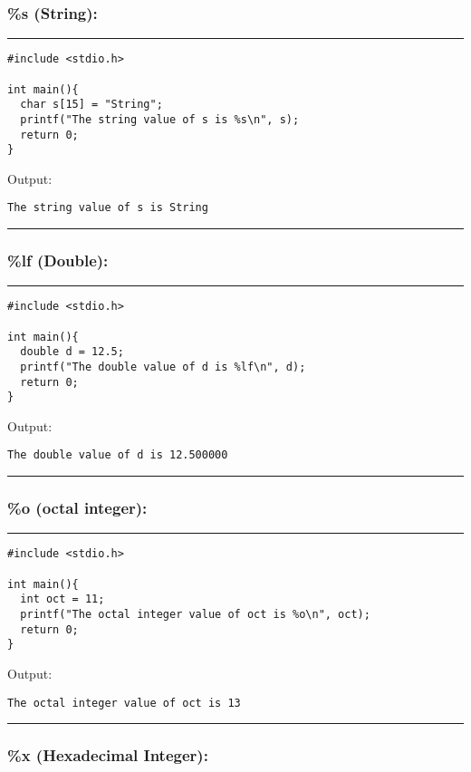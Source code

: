\documentclass[a4paper]{article}
\begin{document}
\subsubsection{\%s (String):}
\label{sec:org304a32a}

\noindent\rule{\textwidth}{0.5pt}
\begin{verbatim}
#include <stdio.h>

int main(){
  char s[15] = "String";
  printf("The string value of s is %s\n", s);
  return 0;
}
\end{verbatim}
Output:
\begin{verbatim}
The string value of s is String
\end{verbatim}

\noindent\rule{\textwidth}{0.5pt}

\subsubsection{\%lf (Double):}
\label{sec:orgfc0ee52}

\noindent\rule{\textwidth}{0.5pt}
\begin{verbatim}
#include <stdio.h>

int main(){
  double d = 12.5;
  printf("The double value of d is %lf\n", d);
  return 0;
}
\end{verbatim}
Output:
\begin{verbatim}
The double value of d is 12.500000
\end{verbatim}

\noindent\rule{\textwidth}{0.5pt}

\subsubsection{\%o (octal integer):}
\label{sec:org72685f7}
\noindent\rule{\textwidth}{0.5pt}
\begin{verbatim}
#include <stdio.h>

int main(){
  int oct = 11;
  printf("The octal integer value of oct is %o\n", oct);
  return 0;
}
\end{verbatim}
Output:
\begin{verbatim}
The octal integer value of oct is 13
\end{verbatim}

\noindent\rule{\textwidth}{0.5pt}

\subsubsection{\%x (Hexadecimal Integer):}
\label{sec:org0e3aa49}
\end{document}
